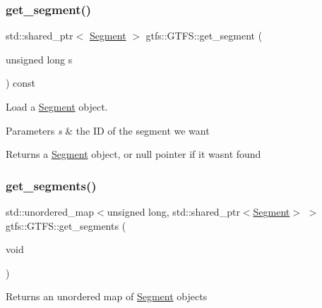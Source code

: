 \subsubsection{\texorpdfstring{get\+\_\+segment()}{get\_segment()}}
{\footnotesize\ttfamily std\+::shared\+\_\+ptr$<$ \hyperlink{classgtfs_1_1Segment}{Segment} $>$ gtfs\+::\+G\+T\+F\+S\+::get\+\_\+segment (\begin{DoxyParamCaption}\item[{unsigned long}]{s }\end{DoxyParamCaption}) const}

Load a \hyperlink{classgtfs_1_1Segment}{Segment} object. 
\begin{DoxyParams}{Parameters}
{\em s} & the ID of the segment we want \\
\hline
\end{DoxyParams}
\begin{DoxyReturn}{Returns}
a \hyperlink{classgtfs_1_1Segment}{Segment} object, or null pointer if it wasn\textquotesingle{}t found 
\end{DoxyReturn}
\mbox{\label{classgtfs_1_1GTFS_ae124db38217498c5e1090447ccf11953}} 
\subsubsection{\texorpdfstring{get\+\_\+segments()}{get\_segments()}}
{\footnotesize\ttfamily std\+::unordered\+\_\+map$<$unsigned long, std\+::shared\+\_\+ptr$<$\hyperlink{classgtfs_1_1Segment}{Segment}$>$ $>$ gtfs\+::\+G\+T\+F\+S\+::get\+\_\+segments (\begin{DoxyParamCaption}\item[{void}]{ }\end{DoxyParamCaption})\hspace{0.3cm}{\ttfamily [inline]}}

\begin{DoxyReturn}{Returns}
an unordered map of \hyperlink{classgtfs_1_1Segment}{Segment} objects 
\end{DoxyReturn}
\mbox{\label{classgtfs_1_1GTFS_a59d1a7209999120b2446298f9fac4564}} 

